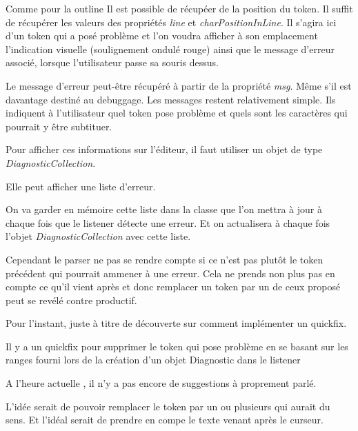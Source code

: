 \documentclass[
    iict, %
    il, %
]{heig-tb}
\begin{document}

Comme pour la outline %
Il est possible de récupéer de la position du token. Il suffit de récupérer les valeurs des propriétés \emph{line} et \emph{charPositionInLine}.
Il s'agira ici d'un token qui a posé problème et l'on voudra afficher à son emplacement l'indication visuelle (soulignement ondulé rouge) ainsi que le message d'erreur associé, lorsque l'utilisateur passe
sa souris dessus.

Le message d'erreur peut-être récupéré à partir de la propriété \emph{msg}. Même s'il est davantage destiné au debuggage.
Les messages restent relativement simple. Ils indiquent à l'utilisateur quel token pose problème et quels sont les caractères qui pourrait y être subtituer.

Pour afficher ces informations sur l'éditeur, il faut utiliser un objet de type \emph{DiagnosticCollection}.

Elle peut afficher une liste d'erreur.

On va garder en mémoire cette liste dans la classe que l'on mettra à jour à chaque fois que le listener détecte une erreur.
Et on actualisera à chaque fois l'objet \emph{DiagnosticCollection} avec cette liste.

Cependant le parser ne pas se rendre compte si ce n'est pas plutôt le token précédent qui pourrait ammener à une erreur.
Cela ne prends non plus pas en compte ce qu'il vient après et donc remplacer un token par un de ceux proposé peut se revélé contre productif.

Pour l'instant, juste à titre de découverte sur comment implémenter un quickfix. %

Il y a un quickfix pour supprimer le token qui pose problème en se basant sur les ranges fourni lors de la création d'un objet Diagnostic dans le listener %

A l'heure actuelle , il n'y a pas encore de suggestions à proprement parlé.

L'idée serait de pouvoir remplacer le token par un ou plusieurs qui aurait du sens.
Et l'idéal serait de prendre en compe le texte venant après le curseur.


\end{document}
